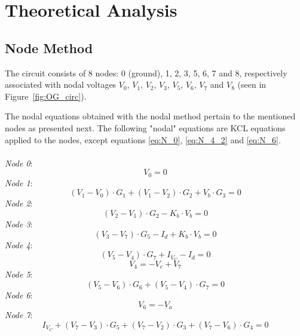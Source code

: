 \section{Theoretical Analysis}
\label{sec:analysis}

\subsection{Node Method}
\label{subsec:node}


The circuit consists of 8 nodes: 0 (ground), 1, 2, 3, 5, 6, 7 and 8, respectively associated with nodal voltages $V_0$, $V_1$, $V_2$, $V_3$, $V_5$, $V_6$, $V_7$ and $V_8$ (seen in Figure~\ref{fig:OG_circ}). 


The nodal equations obtained with the nodal method pertain to the mentioned nodes as presented next. 
The following "nodal" equations are KCL equations applied to the nodes, except equations \ref{eq:N_0}, \ref{eq:N_4_2} 
and \ref{eq:N_6}. \\
\\
\textit{Node 0}:
\begin{equation}
  V_0=0
  \label{eq:N_0}
\end{equation}
\textit{Node 1}:
\begin{equation}
    (V_1 - V_0) \cdot G_1 + (V_1 - V_2) \cdot G_2 + V_b \cdot G_3 = 0
    \label{eq:N_1}
\end{equation}
\textit{Node 2}:
\begin{equation}
    (V_2 - V_1) \cdot G_2 - K_b \cdot V_b = 0
    \label{eq:N_2}
\end{equation}
\textit{Node 3}:
\begin{equation}
    (V_3 - V_7) \cdot G_5 - I_d + K_b \cdot V_b = 0
    \label{eq:N_3}
\end{equation}
\textit{Node 4}:
\begin{equation}
    (V_5 - V_4) \cdot G_7 + I_{V_C} - I_d = 0
    \label{eq:N_4_1}
\end{equation}
\begin{equation}
    V_4 = - V_c + V_7
    \label{eq:N_4_2}
\end{equation}
\textit{Node 5}:
\begin{equation}
  (V_5 - V_6) \cdot G_6 + (V_5 - V_4) \cdot G_7 = 0
  \label{eq:N_5}
\end{equation}
\textit{Node 6}:
\begin{equation}
    V_6 = - V_a
  \label{eq:N_6}
\end{equation}
\textit{Node 7}:
\begin{equation}
  I_{V_C} + (V_7 - V_3) \cdot G_5 + (V_7 - V_2) \cdot G_3 + (V_7 - V_6) \cdot G_4 = 0
  \label{eq:N_7}
\end{equation}

